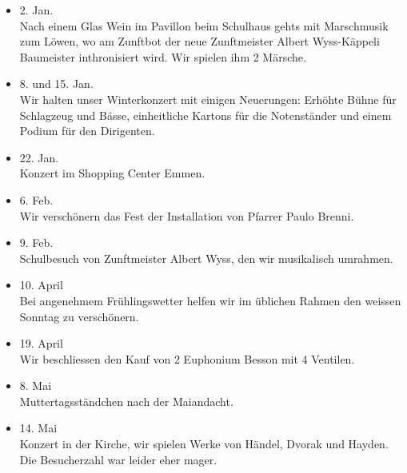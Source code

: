 \begin{multicols}{2}


    \begin{itemize}

        \item[]2. Jan.\\
        Nach einem Glas Wein im Pavillon beim Schulhaus gehts mit Marschmusik
        zum Löwen, wo am Zunftbot der neue Zunftmeister Albert Wyss-Käppeli
        Baumeister inthronisiert wird. Wir spielen ihm 2 Märsche.

        \item[]8. und 15. Jan.\\
        Wir halten unser Winterkonzert mit einigen Neuerungen: Erhöhte Bühne für
        Schlagzeug und Bässe, einheitliche Kartons für die Notenständer und
        einem Podium für den Dirigenten.

        \item[]22. Jan.\\
        Konzert im Shopping Center Emmen.

        \item[]6. Feb.\\
        Wir verschönern das Fest der Installation von Pfarrer Paulo Brenni.

        \item[]9. Feb.\\
        Schulbesuch von Zunftmeister Albert Wyss, den wir musikalisch umrahmen.

        \item[]10. April\\
        Bei angenehmem Frühlingswetter helfen wir im üblichen Rahmen den weissen
        Sonntag zu verschönern.

        \item[]19. April\\
        Wir beschliessen den Kauf von 2 Euphonium Besson mit 4 Ventilen.

        \item[]8. Mai\\
        Muttertagsständchen nach der Maiandacht.

        \item[]14. Mai\\
        Konzert in der Kirche, wir spielen Werke von Händel, Dvorak und Hayden.
        Die Besucherzahl war leider eher mager.


\end{itemize}
\end{multicols}
